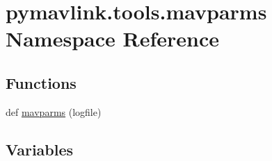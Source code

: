 \hypertarget{namespacepymavlink_1_1tools_1_1mavparms}{}\section{pymavlink.\+tools.\+mavparms Namespace Reference}
\label{namespacepymavlink_1_1tools_1_1mavparms}
\subsection*{Functions}
\begin{DoxyCompactItemize}
\item 
def \hyperlink{namespacepymavlink_1_1tools_1_1mavparms_a2c8ba68bb852463fbf55c9823e303d0a}{mavparms} (logfile)
\end{DoxyCompactItemize}
\subsection*{Variables}

